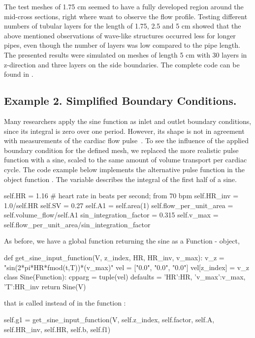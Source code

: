 The test meshes of 1.75 cm seemed to have a fully developed region around the mid-cross sections, right where want to observe the flow profile. Testing different numbers of tubular layers for the length of 1.75, 2.5 and 5 cm showed that the above mentioned observations of wave-like structures occurred less for longer pipes, even though the number of layers was low compared to the pipe length.
The presented results were simulated on meshes of length 5 cm with 30 layers in z-direction and three layers on the side boundaries. The complete code can be found in %
.\\






\subsection{Example 2. Simplified Boundary Conditions.}

Many researchers apply the sine function as inlet and outlet boundary conditions, since its integral is zero over one period. However, its shape is not in agreement with measurements of the cardiac flow pulse~\cite{Lopes2007}. To see the influence of the applied boundary condition for the defined mesh, we replaced the more realistic pulse function with a sine, scaled to the same amount of volume transport per cardiac cycle. The code example below implements the alternative pulse function in the object function . The variable  describes the integral of the first half of a sine.
\begin{python}
self.HR = 1.16 # heart rate in beats per second; from 70 bpm
self.HR_inv = 1.0/self.HR
self.SV = 0.27
self.A1 = self.area(1)
self.flow_per_unit_area = self.volume_flow/self.A1
sin_integration_factor = 0.315
self.v_max = self.flow_per_unit_area/sin_integration_factor
\end{python}
As before, we have a global function returning the sine as a Function - object,
\begin{python}
def get_sine_input_function(V, z_index, HR, HR_inv, v_max):
	v_z = "sin(2*pi*HR*fmod(t,T))*(v_max)"
	vel = ["0.0", "0.0", "0.0"]
	vel[z_index] = v_z
	class Sine(Function):
		cpparg = tuple(vel)
		defaults = {'HR':HR, 'v_max':v_max, 'T':HR_inv}
	return Sine(V)
\end{python}
that is called instead of  in the function :
\begin{python}
self.g1 = get_sine_input_function(V, self.z_index, self.factor, self.A, self.HR_inv, self.HR, self.b, self.f1)
\end{python}




